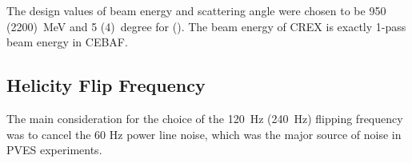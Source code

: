 The design values of beam energy and scattering angle were chosen to be 950 (2200)~MeV
and 5 (4)~degree for \Pb (\Ca). The beam energy of CREX is exactly 1-pass beam
energy in CEBAF.
\begin{comment}
    The measured asymmetry will be:
    \begin{equation*}
	\CA = \frac{2\pi}{R} \int \CA_0(\theta)R(\theta)d\theta
    \end{equation*}

    For PREX-II: average sensitivity reduced by 5\% due to ${}^{12}C$ contamination
    For CREX: average sensitivity reduced by 10\% due to ${}^{40}Ca$ contamination

    While a quartz Cerenkov detector is valued for radiation hardness and insensitivity to soft backgrounds, there is a particular challenge for few GeV electrons. In this energy range, shower fluctuations in a thick or radiated detector significantly degrade energy resolution, while photon statistics degrade the energy resolution for a thin detector. The energy resolution $\Delta E$ at nominal electron energy E increases the statistical error that one would have with infinite resolution $\sigma_0$ to obtain the total statistical error:
$$ \sigma = \sigma_0\sqrt{1+\left(\frac{\Delta E}{E}\right)^2}$$
    
Based on experience in the PREX experiment, we expect an reduction of statistical precision of a factor of 1.06 due to detector resolution.

\bigskip
Using HRS of Hall A, a \textbf{small} scattering angle maximizes the FOM. 
Given practical constraints on how low an angle ($4^\circ$) we can reach with 
septum magnets, the energy is fixed and turns out to be 2.2~GeV, which is a 
natural 1-pass beam energy for CEBAF operations in the 12~GeV era.
\end{comment}

\subsection{Helicity Flip Frequency}
The main consideration for the choice of the 120~Hz (240~Hz) flipping frequency 
was to cancel the 60 Hz power line noise, which was the major source of noise
in PVES experiments. 

